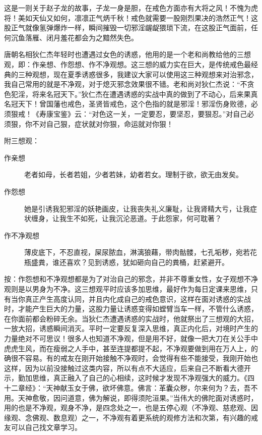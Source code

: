 这是一则关于赵子龙的故事，子龙一身是胆，在戒色方面亦有大将之风！不愧为虎将！美如天仙又如何，凛凛正气炳千秋！戒色就需要一股刚烈果决的浩然正气！这股正气就像氢弹爆炸一样，瞬间摧毁一切邪淫龌龊猥琐下流，在这股正气面前，任何沉鱼落雁、闭月羞花都会为之黯然失色。

唐朝名相狄仁杰年轻时也遭遇过女色的诱惑，他用的是一个老和尚教给他的三想观，即：作亲想、作怨想、作不净观想。这三想的威力实在巨大，是传统戒色最经典的三种观想，现在夏季诱惑很多，我建议大家可以使用这三种观想来对治邪念，我自己常用的就是不净观，对于熄灭邪念效果很不错。老和尚对狄仁杰说：“不贪色犯淫，将来名冠天下。”狄仁杰在遭遇诱惑的实战中真的做到了不动心，后来果真名冠天下！曾国藩也戒色，圣贤皆戒色，这个色指的就是邪淫！邪淫伤身败德，必须狠戒！《寿康宝鉴》云：“对色这一关，一定要忍，要坚忍，要狠忍。”对自己必须狠，你不对自己狠，症状就对你狠，命运就对你狠！

附三想观：

\begin{description}
    \item[作亲想] 老者如母，长者若姐，少者若妹，幼者若女。理制于欲，欲无由发矣。
    \item[作怨想] 她是引诱我犯邪淫的妖艳画皮，让我丧失礼义廉耻，让我肾精大亏，让我症状缠身，让我生不如死，让我沉沦恶道。于此怨家，何可耽著？
    \item[作不净观想] 薄皮底下，不忍直视，屎尿脓血，淋漓狼藉，带肉骷髅，七孔垢秽，宛若花瓶盛粪，谁还喜欢？见到诱惑，犹如砸向自己的粪桶，赶紧避开。
\end{description}

按：作怨想和不净观想都是为了对治自己的邪念，并非不尊重女性，女子观想不净观则是以男身为不净。这三想观平时应该多加思维，最好作为每日定课来思维，只有当你真正产生高度认同，并且内化成自己的戒色意识，这样在面对诱惑的实战时，才能产生巨大的力量，这股力量让诱惑变得如螳臂当车一样，不管什么诱惑，在你面前都会粉碎无余。当狄仁杰遭遇诱惑的实战时，他就祭出了三想观的大招，一放大招，诱惑瞬间消灭。平时一定要反复深入思维，真正内化后，对境时产生的力量绝对不可思议！很多人也知道不净观，但是用不好，就像一把大刀在关公手中虎虎生风，而在瘦弱之人手中，甚至连提都提不起，不净观要做到用在万人上，的确很不容易。有的戒友在刚开始接触不净观时，会觉得有些不能接受，我刚开始也这样，因为以前没接触过这类内容，所以有点不大适应，后来自己不断看大德开示，勤加思维，真正融入了自己的心相续，这时候才发现不净观强大的威力。《四十二章经》：“天神献玉女于佛，欲坏佛意。佛言：革囊众秽，尔来何为？去，吾不用。天神愈敬，因问道意，佛为解说，即得须陀洹果。”当伟大的佛陀面对诱惑时，用的也是不净观，观身不净，是四念处之一，也是五停心观（不净观、慈悲观、因缘观、念佛观、数息观）之一，不净观有着更系统的观修方法和次第，有兴趣的戒友可以自己找文章学习。

